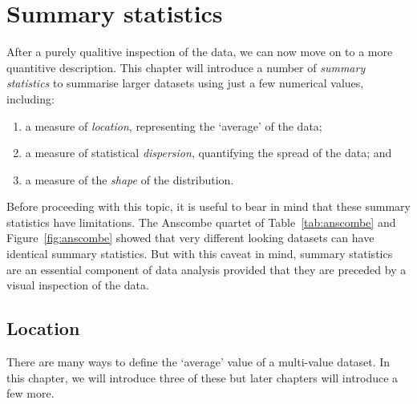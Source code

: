 \chapter{Summary statistics}
\label{ch:summary-statistics}

After a purely qualitive inspection of the data, we can now move on to
a more quantitive description. This chapter will introduce a number of
\emph{summary statistics} to summarise larger datasets using just a
few numerical values, including:

\begin{enumerate}
  \item a measure of \emph{location}, representing the `average' of
    the data;
  \item a measure of statistical \emph{dispersion}, quantifying the
    spread of the data; and
  \item a measure of the \emph{shape} of the distribution.
\end{enumerate}

Before proceeding with this topic, it is useful to bear in mind that
these summary statistics have limitations.  The Anscombe quartet of
Table~\ref{tab:anscombe} and Figure~\ref{fig:anscombe} showed that
very different looking datasets can have identical summary
statistics. But with this caveat in mind, summary statistics are an
essential component of data analysis provided that they are preceded
by a visual inspection of the data.

\section{Location}
\label{sec:location}

There are many ways to define the `average' value of a multi-value
dataset.  In this chapter, we will introduce three of these but later
chapters will introduce a few more.

